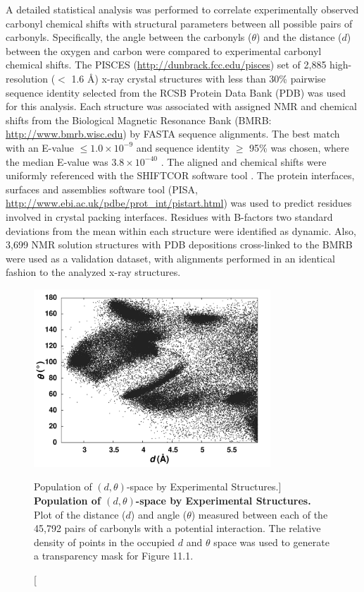 \begin{doublespace}
A detailed statistical analysis was performed to correlate experimentally
observed carbonyl \cnmr{} chemical shifts with structural parameters between
all possible pairs of carbonyls. Specifically, the angle between the carbonyls
($\theta$) and the distance ($d$) between the oxygen and carbon were compared
to experimental carbonyl \cnmr{} chemical shifts. The PISCES
\cite{wang:binf2003} (\url{http://dunbrack.fcc.edu/pisces}) set of
2,885 high-resolution ($<$ 1.6 \r{A}) x-ray crystal structures with less than
30\% pairwise sequence identity selected from the RCSB Protein Data Bank
(PDB) \cite{berman:nar2000} was used for this analysis. Each structure
was associated with assigned NMR \cnmr{} and \nnmr{} chemical shifts from the
Biological Magnetic Resonance Bank (BMRB: \url{http://www.bmrb.wisc.edu})
\cite{ulrich:nar2008} by FASTA \cite{pearson:mmbio2000}
sequence alignments. The best match with an E-value $\leq 1.0\times10^{-9}$
and sequence identity $\geq$ 95\% was chosen, where the median E-value was
$3.8\times10^{-40}$ . The aligned \cnmr{} and \nnmr{} chemical shifts were
uniformly referenced with the SHIFTCOR software tool
\cite{wishart:jbnmr2003}. The protein interfaces,
surfaces and assemblies software tool
(PISA, \url{http://www.ebi.ac.uk/pdbe/prot_int/pistart.html})
\cite{krissinel:acryst2004} was used to predict residues involved
in crystal packing interfaces. Residues with B-factors two standard deviations
from the mean within each structure were identified as dynamic. Also, 3,699 NMR
solution structures with PDB depositions cross-linked to the BMRB were
used as a validation dataset, with alignments performed in an identical
fashion to the analyzed x-ray structures.
\end{doublespace}

\begin{figure}
\includegraphics[width=3.5in]{figs/npistar/02-dtheta.png}
\caption
      [Population of $(d,\theta)$-space by Experimental Structures.]{
  {\bf Population of $(d,\theta)$-space by Experimental Structures.}
  \\
  Plot of the distance ($d$) and angle ($\theta$) measured between each of
  the 45,792 pairs of carbonyls with a potential \npistar{} interaction. The
  relative density of points in the occupied $d$ and $\theta$ space was used
  to generate a transparency mask for Figure 11.1.
}
\end{figure}

